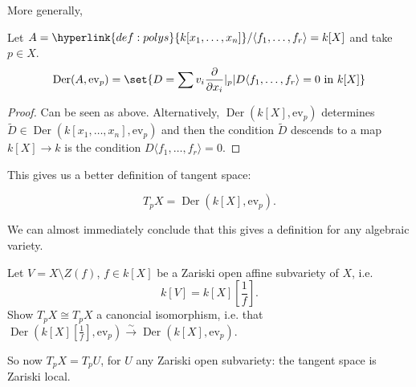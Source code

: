 \documentclass{article}
\DeclareMathOperator{\Der}{Der}
\begin{document}
More generally,
\begin{lemma}
    Let $A = \hyperlink{def:polys}{k[x_1, \dotsc, x_n]}/\langle f_1, \dotsc, f_r \rangle = k[X]$ and take $p \in X$.
    \begin{equation*}
        \Der(A, \text{ev}_p) = \set{D = \sum v_i \frac{\partial}{\partial x_i} |_p | D \langle f_1, \dotsc, f_r \rangle = 0 \text{ in } k[X]}
    \end{equation*}
\end{lemma}
\begin{proof}
    Can be seen as above.
    Alternatively, $\Der(k[X], \text{ev}_p)$ determines $\tilde{D} \in \Der(k[x_1, \dotsc, x_n], \text{ev}_p)$ and then the condition $\tilde{D}$ descends to a map $k[X] \to k$ is the condition $D\langle f_1, \dotsc, f_r \rangle = 0$.
\end{proof}
This gives us a better definition of tangent space:
\begin{defi}
    \begin{equation*}
        T_p X = \Der(k[X], \text{ev}_p).
    \end{equation*}
\end{defi}
We can almost immediately conclude that this gives a definition for any algebraic variety.
\begin{ex}
    Let $V = X \setminus Z(f)$, $f \in k[X]$ be a Zariski open affine subvariety of $X$, i.e.\
    \begin{equation*}
        k[V] = k[X][\frac{1}{f}].
    \end{equation*}
    Show $T_p X \cong T_p X$ a canoncial isomorphism, i.e. that $\Der(k[X][\frac{1}{f}], \text{ev}_p) \xrightarrow{\sim} \Der(k[X], \text{ev}_p)$.
\end{ex}
So now $T_p X = T_p U$, for $U$ any Zariski open subvariety: the tangent space is Zariski local.
\end{document}
